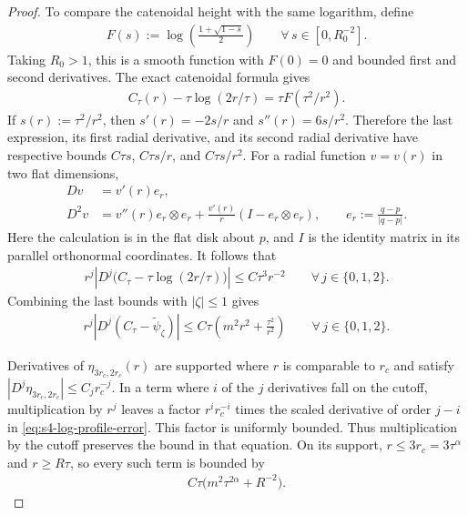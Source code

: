 \documentclass[a4paper,11pt,oneside,reqno]{amsart}
\numberwithin{equation}{section}
\theoremstyle{definition}
\begin{document}
\begin{proof}
    To compare the catenoidal height with the same logarithm,
    define
    \begin{align*}
        F(s):=\log\left(\frac{1+\sqrt{1-s}}2\right)
        \qquad\forall\,s\in[0,R_0^{-2}].
    \end{align*}
    Taking $R_0>1$, this is a smooth function with $F(0)=0$
    and bounded first and second derivatives. The exact
    catenoidal formula gives
    \begin{align*}
        C_\tau(r)-\tau\log(2r/\tau)
        =\tau F(\tau^2/r^2).
    \end{align*}
    If $s(r):=\tau^2/r^2$, then
    $s'(r)=-2s/r$ and $s''(r)=6s/r^2$.
    Therefore the last expression, its first radial
    derivative, and its second radial derivative have
    respective bounds
    $C\tau s$, $C\tau s/r$, and $C\tau s/r^2$.
    For a radial function $v=v(r)$ in two flat dimensions,
    \begin{align*}
        Dv&=v'(r)e_r,\\
        D^2v&=v''(r)e_r\otimes e_r
                 +\frac{v'(r)}r(I-e_r\otimes e_r),
        \qquad e_r:=\frac{q-p}{|q-p|}.
    \end{align*}
    Here the calculation is in the flat disk about $p$,
    and $I$ is the identity matrix in its parallel
    orthonormal coordinates. It follows that
    \begin{align*}
        r^j\left|D^j\bigl(C_\tau-\tau\log(2r/\tau)\bigr)\right|
        \leq C\tau^3r^{-2}
        \qquad\forall\,j\in\{0,1,2\}.
    \end{align*}
    Combining the last bounds with $|\zeta|\leq1$ gives
    \begin{align}
        \label{eq:s4-log-profile-error}
        r^j|D^j(C_\tau-\widetilde\psi_\zeta)|
        \leq C\tau\left(m^2r^2+\frac{\tau^2}{r^2}\right)
        \qquad\forall\,j\in\{0,1,2\}.
    \end{align}

    Derivatives of $\eta_{3r_c,2r_c}(r)$ are supported
    where $r$ is comparable to $r_c$ and satisfy
    $|D^j\eta_{3r_c,2r_c}|\leq C_jr_c^{-j}$.
    In a term where $i$ of the $j$ derivatives fall on
    the cutoff, multiplication by $r^j$ leaves a factor
    $r^ir_c^{-i}$ times the scaled derivative of order
    $j-i$ in \eqref{eq:s4-log-profile-error}.
    This factor is uniformly bounded. Thus multiplication
    by the cutoff preserves the bound in that equation.
    On its support, $r\leq3r_c=3\tau^\alpha$ and
    $r\geq R\tau$, so every such term is bounded by
    \begin{align*}
        C\tau\bigl(m^2\tau^{2\alpha}+R^{-2}\bigr).
    \end{align*}


\end{proof}
\end{document}
